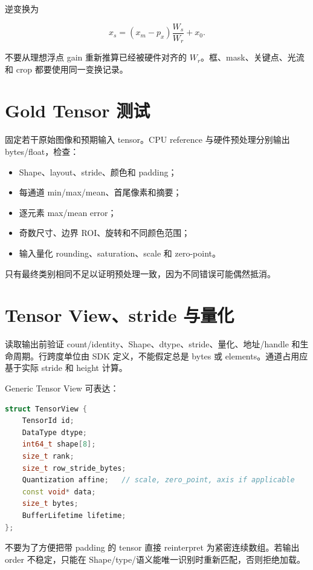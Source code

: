 逆变换为

\begin{equation}
  x_s=(x_m-p_x)\frac{W_s}{W_r}+x_0.
\end{equation}

不要从理想浮点 gain 重新推算已经被硬件对齐的 $W_r$。框、mask、关键点、光流和 crop 都要使用同一变换记录。

\section{Gold Tensor 测试}

固定若干原始图像和预期输入 tensor。CPU reference 与硬件预处理分别输出 bytes/float，检查：

\begin{itemize}
  \item Shape、layout、stride、颜色和 padding；
  \item 每通道 min/max/mean、首尾像素和摘要；
  \item 逐元素 max/mean error；
  \item 奇数尺寸、边界 ROI、旋转和不同颜色范围；
  \item 输入量化 rounding、saturation、scale 和 zero-point。
\end{itemize}

只有最终类别相同不足以证明预处理一致，因为不同错误可能偶然抵消。

\section{Tensor View、stride 与量化}

读取输出前验证 count/identity、Shape、dtype、stride、量化、地址/handle 和生命周期。行跨度单位由 SDK 定义，不能假定总是 bytes 或 elements。通道占用应基于实际 stride 和 height 计算。

Generic Tensor View 可表达：

\begin{lstlisting}[language=C++,caption={通用 tensor 视图的逻辑结构}]
struct TensorView {
    TensorId id;
    DataType dtype;
    int64_t shape[8];
    size_t rank;
    size_t row_stride_bytes;
    Quantization affine;   // scale, zero_point, axis if applicable
    const void* data;
    size_t bytes;
    BufferLifetime lifetime;
};
\end{lstlisting}

不要为了方便把带 padding 的 tensor 直接 reinterpret 为紧密连续数组。若输出 order 不稳定，只能在 Shape/type/语义能唯一识别时重新匹配，否则拒绝加载。

